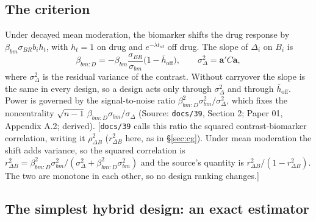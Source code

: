 \documentclass[11pt]{article}
\newcommand{\note}[1]{\textcolor{blue!60!black}{\small [#1]}}
\newcommand{\code}[1]{\texttt{#1}}
\begin{document}
\subsection{The criterion}

Under decayed mean moderation, the biomarker shifts the drug response
by $\beta_{bm}\sigma_{BR}b_i h_t$, with $h_t = 1$ on drug and
$e^{-\lambda t_{sd}}$ off drug. The slope of $\Delta_i$ on $B_i$ is
\begin{equation}
\beta_{bm:D} = -\beta_{bm}\frac{\sigma_{BR}}{\sigma_{bm}}
  \big(1 - \bar h_{\text{off}}\big), \qquad
\sigma_\Delta^2 = \mathbf a' C \mathbf a,
\label{eq:bp-criterion}
\end{equation}
where $\sigma_\Delta^2$ is the residual variance of the contrast. Without
carryover the slope is the same in every design, so a design acts only
through $\sigma_\Delta^2$ and through $\bar h_{\text{off}}$. Power is governed by
the signal-to-noise ratio $\beta_{bm:D}^2\sigma_{bm}^2/\sigma_\Delta^2$, which
fixes the noncentrality $\sqrt{n-1}\,\beta_{bm:D}\sigma_{bm}/\sigma_\Delta$
(Source: \code{docs/39}, Section 2; Paper 01, Appendix A.2; derived).
\note{\code{docs/39} calls this ratio the squared contrast-biomarker
correlation, writing it $\rho_{\Delta B}^2$ ($r_{\Delta B}^2$ here, as
in \S\ref{sec:cg}). Under mean moderation the shift adds
variance, so the squared correlation is
$r_{\Delta B}^2 = \beta_{bm:D}^2\sigma_{bm}^2/(\sigma_\Delta^2 + \beta_{bm:D}^2\sigma_{bm}^2)$
and the source's quantity is $r_{\Delta B}^2/(1 - r_{\Delta
B}^2)$. The two are monotone in each other, so no design ranking
changes.}

\subsection{The simplest hybrid design: an exact estimator}
\end{document}
